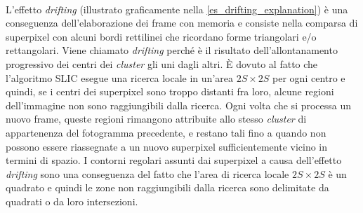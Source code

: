 \documentclass[12pt,a4paper,oneside]{article}
\begin{document}
\\L'effetto \textit{drifting} (illustrato graficamente nella \cref{es_drifting_explanation}) è una conseguenza dell'elaborazione dei frame con memoria e consiste nella comparsa di superpixel con alcuni bordi rettilinei che ricordano forme triangolari e/o rettangolari. Viene chiamato \textit{drifting} perché è il risultato dell'allontanamento progressivo dei centri dei \textit{cluster} gli uni dagli altri. È dovuto al fatto che l'algoritmo \gls{SLIC} esegue una ricerca locale in un'area $2S \times 2S$ per ogni centro e quindi, se i centri dei superpixel sono troppo distanti fra loro, alcune regioni dell'immagine non sono raggiungibili dalla ricerca. Ogni volta che si processa un nuovo frame, queste regioni rimangono attribuite allo stesso \textit{cluster} di appartenenza del fotogramma precedente, e restano tali fino a quando non possono essere riassegnate a un nuovo superpixel sufficientemente vicino in termini di spazio. I contorni regolari assunti dai superpixel a causa dell'effetto \textit{drifting} sono una conseguenza del fatto che l'area di ricerca locale $2S \times 2S$ è un quadrato e quindi le zone non raggiungibili dalla ricerca sono delimitate da quadrati o da loro intersezioni.
\end{document}
